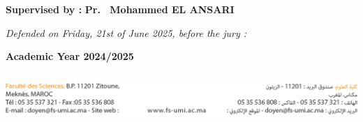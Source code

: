 \documentclass[a4paper,12pt]{report}
\begin{document}
\begin{titlepage}
\begin{center}
\begin{flushleft}
        \end{flushleft}
        \begin{flushleft}
              \textbf{Supervised by :} \hspace{1cm} \textbf{Pr. ~Mohammed \textsc{EL ANSARI }} \hspace{2cm}
            \end{flushleft}

    \begin{flushleft}
         {\large \textit{Defended on Friday, 21st of June 2025, before the jury : }}\\[0.5cm]
    \end{flushleft}


    \bf \large{Academic Year 2024/2025 } \\[3.2cm]

        \begin{minipage}{17cm}
    	\begin{center}
    		\includegraphics[width=17cm,height=2cm]{Pics/FooterUMI.png}
    	\end{center}
    \end{minipage}

    \end{center}
\end{titlepage}
\end{document}
